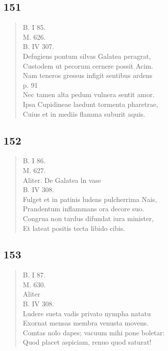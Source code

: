 \documentclass[11pt, a4paper]{report}
\begin{document}
            \subsection*{151}
      \begin{verse}
      B. I 85. \\ M. 626. \\ B. IV 307. \\ Defugiens pontum silvas Galatea peragrat, \\ Custodem ut pecorum cernere possit Acim. \\ Nam teneros gressus infigit sentibus ardens \\ p. 91 \\ Nec tamen alta pedum vulnera sentit amor. \\ Ipsa Cupidineae laedunt tormenta pharetrae, \\ Cuius et in mediis flamma suburit aquis. \\ 
      \end{verse}
  
            \subsection*{152}
      \begin{verse}
      B. I 86. \\ M. 627. \\ Aliter. De Galatea ln vase \\ B. IV 308. \\ Fulget et in patinis ludens pulcherrima Nais, \\ Prandentum inflammans ora decore suo. \\ Congrua non tardus difundat iura minister, \\ Et lateat positis tecta libido cibis. \\ 
      \end{verse}
  
            \subsection*{153}
      \begin{verse}
      B. I 87. \\ M. 630. \\ Aliter \\ B. IV 308. \\ Ludere sueta vadis privato nympha natatu \\ Exornat mensas membra venusta movens. \\ Comtas nolo dapes; vacuum mihi pone boletar: \\ Quod placet aspiciam, renuo quod saturat! \\ 
      \end{verse}
  
\end{document}
